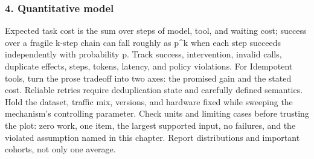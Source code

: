 \subsubsection*{4. Quantitative model}
Expected task cost is the sum over steps of model, tool, and waiting cost; success over a fragile k-step chain can fall roughly as p\textasciicircum{}k when each step succeeds independently with probability p. Track success, intervention, invalid calls, duplicate effects, steps, tokens, latency, and policy violations.
For Idempotent tools, turn the prose tradeoff into two axes: the promised gain and the stated cost. Reliable retries require deduplication state and carefully defined semantics. Hold the dataset, traffic mix, versions, and hardware fixed while sweeping the mechanism's controlling parameter.
Check units and limiting cases before trusting the plot: zero work, one item, the largest supported input, no failures, and the violated assumption named in this chapter. Report distributions and important cohorts, not only one average.
